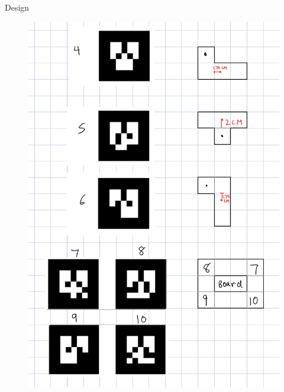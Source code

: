 \documentclass{beamer}
\begin{document}
\begin{frame}{Design}
\begin{figure}
      \hspace{0.5cm}
      \includegraphics[height=0.85\textheight]{tiles-2}
    \end{figure}
  \end{frame}
\end{document}
